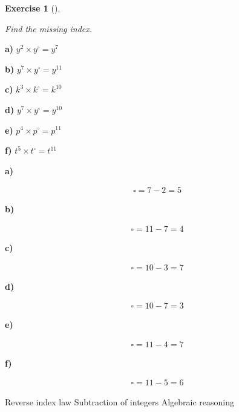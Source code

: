 \documentclass[
  letterpaper,
  DIV=11,
  numbers=noendperiod]{scrreprt}
\theoremstyle{definition}
\newtheorem{exercise}{Exercise}[chapter]
\theoremstyle{remark}
\begin{document}
\begin{exercise}[]\protect\hypertarget{exr-u2-27}{}\label{exr-u2-27}

\emph{Find the missing index.}

\textbf{a)} \(\displaystyle y^{2} \times y^{\square} = y^{7}\)

\textbf{b)} \(\displaystyle y^{7} \times y^{\square} = y^{11}\)

\textbf{c)} \(\displaystyle k^{3} \times k^{\square} = k^{10}\)

\textbf{d)} \(\displaystyle y^{7} \times y^{\square} = y^{10}\)

\textbf{e)} \(\displaystyle p^{4} \times p^{\square} = p^{11}\)

\textbf{f)} \(\displaystyle t^{5} \times t^{\square} = t^{11}\)

\begin{tcolorbox}[enhanced jigsaw, opacitybacktitle=0.6, coltitle=black, arc=.35mm, colframe=quarto-callout-tip-color-frame, colback=white, bottomrule=.15mm, left=2mm, colbacktitle=quarto-callout-tip-color!10!white, titlerule=0mm, opacityback=0, title=\textcolor{quarto-callout-tip-color}{\faLightbulb}\hspace{0.5em}{🔍 View Solutions}, leftrule=.75mm, breakable, rightrule=.15mm, bottomtitle=1mm, toptitle=1mm, toprule=.15mm]

\textbf{a)}

\[
\begin{aligned}
\square = 7 - 2 = 5
\end{aligned}
\]

\textbf{b)}

\[
\begin{aligned}
\square = 11 - 7 = 4
\end{aligned}
\]

\textbf{c)}

\[
\begin{aligned}
\square = 10 - 3 = 7
\end{aligned}
\]

\textbf{d)}

\[
\begin{aligned}
\square = 10 - 7 = 3
\end{aligned}
\]

\textbf{e)}

\[
\begin{aligned}
\square = 11 - 4 = 7
\end{aligned}
\]

\textbf{f)}

\[
\begin{aligned}
\square = 11 - 5 = 6
\end{aligned}
\]

\end{tcolorbox}

{Reverse index law} {Subtraction of integers} {Algebraic reasoning}

\end{exercise}
\end{document}
